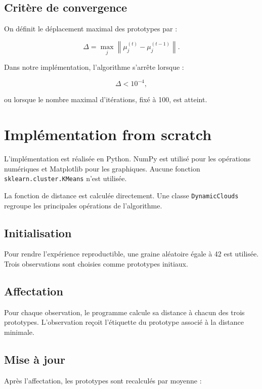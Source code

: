 \documentclass[12pt,a4paper]{article}
\begin{document}
\subsection{Critère de convergence}

On définit le déplacement maximal des prototypes par :

\[
\Delta=
\max_j
\left\|
\mu_j^{(t)}-\mu_j^{(t-1)}
\right\|.
\]

Dans notre implémentation, l'algorithme s'arrête lorsque :

\[
\Delta < 10^{-4},
\]

ou lorsque le nombre maximal d'itérations, fixé à 100, est atteint.

\section{Implémentation from scratch}

L'implémentation est réalisée en Python. NumPy est utilisé pour les opérations numériques et Matplotlib pour les graphiques. Aucune fonction \texttt{sklearn.cluster.KMeans} n'est utilisée.

La fonction de distance est calculée directement. Une classe \texttt{DynamicClouds} regroupe les principales opérations de l'algorithme.

\subsection{Initialisation}

Pour rendre l'expérience reproductible, une graine aléatoire égale à 42 est utilisée. Trois observations sont choisies comme prototypes initiaux.

\subsection{Affectation}

Pour chaque observation, le programme calcule sa distance à chacun des trois prototypes. L'observation reçoit l'étiquette du prototype associé à la distance minimale.

\subsection{Mise à jour}

Après l'affectation, les prototypes sont recalculés par moyenne :
\end{document}

